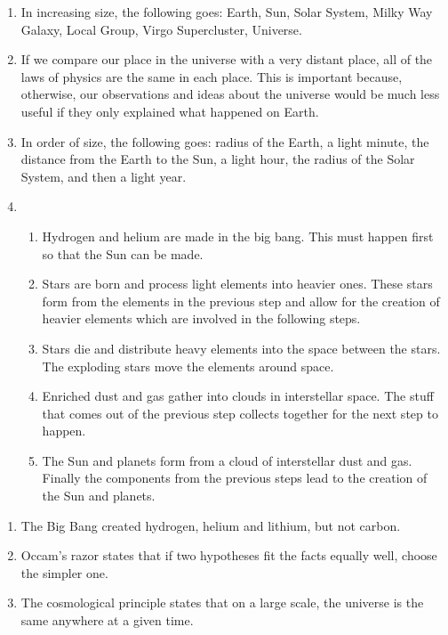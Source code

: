 \documentclass[../hw1.tex]{subfiles}
\begin{document}
    \begin{enumerate}
        \item In increasing size, the following goes: Earth, Sun, Solar System, Milky Way Galaxy, Local Group, Virgo Supercluster, Universe.
        \item {} If we compare our place in the universe with a very distant place, all of the laws of physics are the same in each place. This is important because, otherwise, our observations and ideas about the universe would be much less useful if they only explained what happened on Earth.
        \item In order of size, the following goes: radius of the Earth, a light minute, the distance from the Earth to the Sun, a light hour, the radius of the Solar System, and then a light year.
        \item{}\begin{enumerate}
                \item Hydrogen and helium are made in the big bang. This must happen first so that the Sun can be made.
                \item Stars are born and process light elements into heavier ones. These stars form from the elements in the previous step and allow for the creation of heavier elements which are involved in the following steps.
                \item Stars die and distribute heavy elements into the space between the stars. The exploding stars move the elements around space.
                \item Enriched dust and gas gather into clouds in interstellar space. The stuff that comes out of the previous step collects together for the next step to happen.
                \item The Sun and planets form from a cloud of interstellar dust and gas. Finally the components from the previous steps lead to the creation of the Sun and planets.
            \end{enumerate}
    \end{enumerate}
    \begin{enumerate}
        \item{} The Big Bang created hydrogen, helium and lithium, but not carbon.
        \item{} Occam's razor states that if two hypotheses fit the facts equally well, choose the simpler one.
        \item{} The cosmological principle states that on a large scale, the universe is the same anywhere at a given time.
    \end{enumerate}
    
\end{document}
